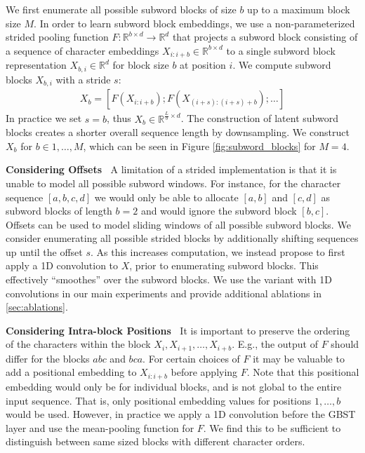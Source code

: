 \documentclass{article} \usepackage{iclr2022_conference,times}
\begin{document}
We first enumerate all possible subword blocks of size $b$ up to a maximum block size $M$. In order to learn subword block embeddings, we use a non-parameterized strided pooling function $F: \mathbb{R}^{b \times d} \rightarrow \mathbb{R}^d$ that projects a subword block consisting of a sequence of character embeddings $X_{i:i+b} \in \mathbb{R}^{b \times d}$ to a single subword block representation $X_{b, i} \in \mathbb{R}^d$ for block size $b$ at position $i$. We compute subword blocks $X_{b, i}$ with a stride $s$:
\begin{align}
X_{b} = [F(X_{i:i+b});F(X_{(i+s):(i+s)+b}); \ldots]
\end{align}
In practice we set $s = b$, thus $X_{b} \in \mathbb{R}^{\frac{L}{b} \times d}$. The construction of latent subword blocks creates a shorter overall sequence length by downsampling. We construct $X_{b}$ for $b \in 1, \dots, M$, which can be seen in Figure \ref{fig:subword_blocks} for $M=4$.

\noindent \textbf{Considering Offsets} $\:$ A limitation of a strided implementation is that it is unable to model all possible subword windows. For instance, for the character sequence $[a, b, c, d]$ we would only be able to allocate $[a, b]$ and $[c, d]$ as subword blocks of length $b=2$ and would ignore the subword block $[b, c]$. Offsets can be used to model sliding windows of all possible subword blocks. We consider enumerating all possible strided blocks by additionally shifting sequences up until the offset $s$. As this increases computation, we instead propose to first apply a 1D convolution to $X$, prior to enumerating subword blocks. This effectively ``smoothes'' over the subword blocks. We use the variant with 1D convolutions in our main experiments and provide additional ablations in \textsection \ref{sec:ablations}.


\noindent \textbf{Considering Intra-block Positions} $\:$ It is important to preserve the ordering of the characters within the block $X_i, X_{i+1}, \dots, X_{i+b}$. E.g., the output of $F$ should differ for the blocks $abc$ and $bca$. For certain choices of $F$ it may be valuable to add a positional embedding \citep{NIPS2017_3f5ee243} to $X_{i:i+b}$ before applying $F$. Note that this positional embedding would only be for individual blocks, and is not global to the entire input sequence. That is, only positional embedding values for positions $1, \dots, b$ would be used. However, in practice we apply a 1D convolution before the GBST layer and use the mean-pooling function for $F$. We find this to be sufficient to distinguish between same sized blocks with different character orders.
\end{document}
